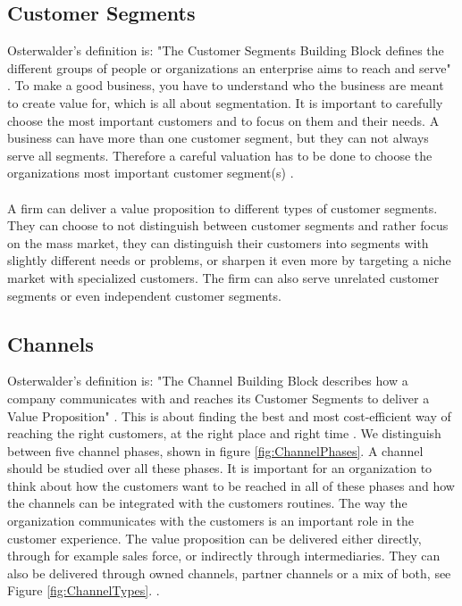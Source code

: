 \subsection{Customer Segments}
Osterwalder's definition is: "The Customer Segments Building Block defines the different groups of people or organizations an enterprise aims to reach and serve" \cite{osterwalder}. To make a good business, you have to understand who the business are meant to create value for, which is all about segmentation. It is important to carefully choose the most important customers and to focus on them and their needs. A business can have more than one customer segment, but they can not always serve all segments. Therefore a careful valuation has to be done to choose the organizations most important customer segment(s) \cite{osterwalder} \cite{osterwalderthesis}. \\ \\
A firm can deliver a value proposition to different types of customer segments. They can choose to not distinguish between customer segments and rather focus on the mass market, they can distinguish their customers into segments with slightly different needs or problems, or sharpen it even more by targeting a niche market with specialized customers. The firm can also serve unrelated customer segments or even independent customer segments. \cite{osterwalder}

\subsection{Channels}
Osterwalder's definition is: "The Channel Building Block describes how a company communicates with and reaches its Customer Segments to deliver a Value Proposition" \cite{osterwalder}. This is about finding the best and most cost-efficient way of reaching the right customers, at the right place and right time \cite{osterwalderthesis}. We distinguish between five channel phases, shown in figure \ref{fig:ChannelPhases}. A channel should be studied over all these phases. It is important for an organization to think about how the customers want to be reached in all of these phases and how the channels can be integrated with the customers routines. The way the organization communicates with the customers is an important role in the customer experience. The value proposition can be delivered either directly, through for example sales force, or indirectly through intermediaries. They can also be delivered through owned channels, partner channels or a mix of both, see Figure  \ref{fig:ChannelTypes}.
 \cite{osterwalderthesis}. \\ \\

